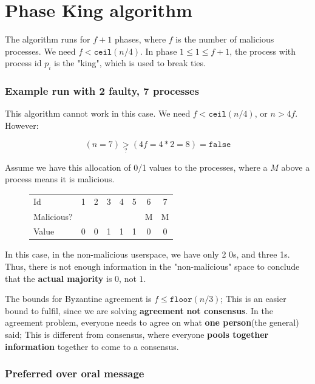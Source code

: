 \documentclass{article}
\begin{document}
\section{Phase King algorithm}

The algorithm runs for $f+1$ phases, where $f$ is the number of malicious processes.
We need $f < \texttt{ceil}(n/4)$. In phase $1 \leq 1 \leq f + 1$, the process
with process id $p_i$ is the "king", which is used to break ties. 

\subsubsection{Example run with 2 faulty, 7 processes}

This algorithm cannot work in this case. We need $f < \texttt{ceil}(n/4)$, or $n > 4 f$.
However:

$$(n=7) \underset{?}{>} (4f = 4*2 = 8) = \texttt{false}$$

Assume we have this allocation of 0/1 values to
the processes, where a $M$ above a process means it is malicious.

\begin{figure}[h]
\centering
\begin{tabular}{lccccccc}
  Id         &1 & 2 & 3 & 4 & 5 & 6 & 7 \\
  Malicious? &  &   &   &   &   & M & M \\
  Value      &0 & 0 & 1 & 1 & 1 & 0 & 0 \\
\end{tabular}
\end{figure}

In this case, in the non-malicious userspace, we have only 2 0s, and three 1s.
Thus, there is not enough information in the "non-malicious" space to conclude
that the \textbf{actual majority} is $0$, not $1$.

The bounds for Byzantine agreement is $f \leq \texttt{floor}(n/3)$; This is
an easier bound to fulfil, since we are
solving \textbf{agreement} \textbf{not consensus}. In the agreement problem,
everyone needs to agree on what \textbf{one person}(the general) said;
This is different from consensus, where everyone \textbf{pools together information}
together to come to a consensus.

\subsubsection{Preferred over oral message}
\end{document}
